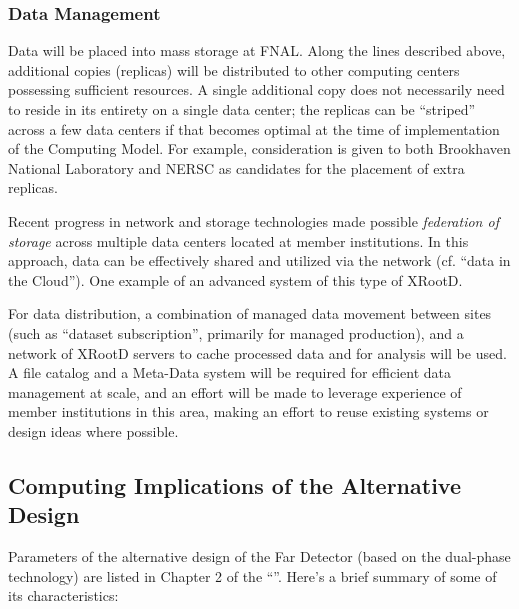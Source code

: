 \subsubsection{Data Management}
\label{sec:detectors-sc-infrastructure-computing-model-data-mgt}

Data will be placed into mass storage at FNAL. Along the lines
described above, additional copies (replicas) will be distributed to
other computing centers possessing sufficient resources.  A single
additional copy does not necessarily need to reside in its entirety on
a single data center; the replicas can be ``striped'' across a few
data centers if that becomes optimal at the time of implementation of
the Computing Model. For example, consideration is given to both
Brookhaven National Laboratory and NERSC as candidates for the
placement of extra replicas.

Recent progress in network and storage technologies made possible
\textit{federation of storage} across multiple data centers located at
member institutions. In this approach, data can be effectively shared
and utilized via the network (cf. ``data in the Cloud''). One example
of an advanced system of this type of XRootD.

For data distribution, a combination of managed data movement between
sites (such as ``dataset subscription'', primarily for managed
production), and a network of XRootD servers to cache processed data
and for analysis will be used.  A file catalog and a Meta-Data system
will be required for efficient data management at scale, and an effort
will be made to leverage experience of member institutions in this
area, making an effort to reuse existing systems or design ideas where
possible.

\subsection{Computing Implications of the Alternative Design}
\label{sec:detectors-sc-alternate}
Parameters of the alternative design of the Far Detector (based on the
dual-phase technology) are listed in Chapter 2 of the
``\anxrates''. Here's a brief summary of some of its characteristics:

